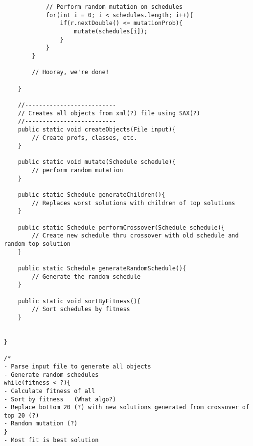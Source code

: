 \documentclass{article}
\begin{document}
\begin{lstlisting}
			// Perform random mutation on schedules
			for(int i = 0; i < schedules.length; i++){
				if(r.nextDouble() <= mutationProb){
					mutate(schedules[i]);
				}
			}
		}

		// Hooray, we're done!

	}

	//--------------------------
	// Creates all objects from xml(?) file using SAX(?)
	//--------------------------
	public static void createObjects(File input){
		// Create profs, classes, etc.
	}

	public static void mutate(Schedule schedule){
		// perform random mutation
	}

	public static Schedule generateChildren(){
		// Replaces worst solutions with children of top solutions
	}

	public static Schedule performCrossover(Schedule schedule){
		// Create new schedule thru crossover with old schedule and random top solution
	}

	public static Schedule generateRandomSchedule(){
		// Generate the random schedule
	}

	public static void sortByFitness(){
		// Sort schedules by fitness
	}


}

/*
- Parse input file to generate all objects
- Generate random schedules
while(fitness < ?){
- Calculate fitness of all
- Sort by fitness 	(What algo?)
- Replace bottom 20 (?) with new solutions generated from crossover of top 20 (?)
- Random mutation (?)
}
- Most fit is best solution
\end{lstlisting}
\end{document}
